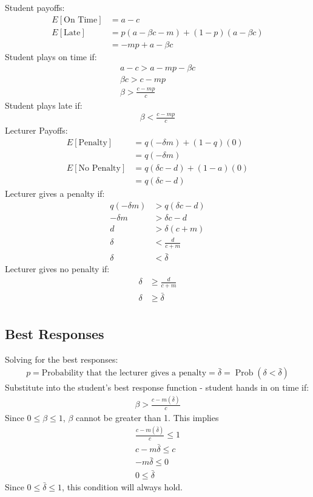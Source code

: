 \documentclass[11pt,preprint, authoryear]{elsarticle}
\numberwithin{equation}{section}
\numberwithin{figure}{section}
\numberwithin{table}{section}
\begin{document}
Student payoffs: \begin{align*}
E[\text{On Time}]&= a- c \\
E[\text{Late}]&=  p(a-\beta c-m) +(1-p)(a-\beta c) \\
&=-m p+a-\beta c
\end{align*} Student plays on time if: \begin{align*}
a-c>a-m p-\beta c \\
\beta c>c-m p \\
\beta>\frac{c-m p}{c}
\end{align*} Student plays late if: \begin{align*}
\beta<\frac{c-m p}{c}
\end{align*} Lecturer Payoffs: \begin{align*}
E[\text{Penalty}]&=q(-\delta m)+(1-q)(0) \\
&=q(-\delta m) \\
E[\text{No Penalty}] &=q(\delta c-d)+(1-a)(0) \\
&=q(\delta c-d)
\end{align*} Lecturer gives a penalty if: \begin{align*}
q(-\delta m)&>q(\delta c-d) \\
-\delta m&>\delta c-d \\
d&>\delta(c+m) \\
\delta&<\frac{d}{c+m} \\
\delta &<\bar{\delta}
\end{align*} Lecturer gives no penalty if: \begin{align*}
\delta &\geq \frac{d}{c+m} \\
\delta &\geq \bar{\delta} \\
\end{align*}

\hypertarget{best-responses}{%
\subsection*{\texorpdfstring{Best Responses
\label{br}}{Best Responses }}\label{best-responses}}

Solving for the best responses: \begin{align*}
p=\text{Probability that the lecturer gives a penalty} = \bar{\delta}=\operatorname{Prob}(\delta<\bar{\delta})
\end{align*} Substitute into the student's best response function -
student hands in on time if: \begin{align*}{}
\beta>\frac{c-m(\bar{\delta})}{c}
\end{align*}{} Since \(0 \leq \beta \leq 1\), \(\beta\) cannot be
greater than 1. This implies \begin{align*}{}
\frac{c-m(\bar{\delta})}{c} \leq 1 \\
c-m \bar{\delta} \leq c \\
-m \bar{\delta} \leq 0 \\
0 \leq \bar{\delta}
\end{align*}{} Since \(0 \leq \bar{\delta} \leq 1\), this condition will
always hold.
\end{document}
